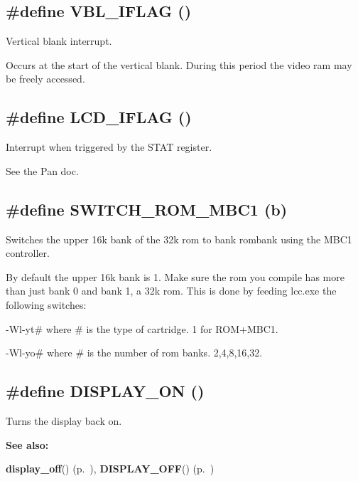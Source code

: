 \subsection{\setlength{\rightskip}{0pt plus 5cm}\#define VBL\_\-IFLAG ()}

Vertical blank interrupt.

Occurs at the start of the vertical blank. During this period the video ram may be freely accessed. \label{gb.h_a18}
\subsection{\setlength{\rightskip}{0pt plus 5cm}\#define LCD\_\-IFLAG ()}

Interrupt when triggered by the STAT register.

See the Pan doc. \label{gb.h_a35}
\subsection{\setlength{\rightskip}{0pt plus 5cm}\#define SWITCH\_\-ROM\_\-MBC1 (b)}

Switches the upper 16k bank of the 32k rom to bank rombank using the MBC1 controller.

By default the upper 16k bank is 1. Make sure the rom you compile has more than just bank 0 and bank 1, a 32k rom. This is done by feeding lcc.exe the following switches:

-Wl-yt\# where \# is the type of cartridge. 1 for ROM+MBC1.

-Wl-yo\# where \# is the number of rom banks. 2,4,8,16,32. \label{gb.h_a43}
\subsection{\setlength{\rightskip}{0pt plus 5cm}\#define DISPLAY\_\-ON ()}

Turns the display back on.

\begin{Desc}
\item[{\bf See also: }]\par
{\bf display\_\-off}() {\rm (p.~\pageref{gb.h_a76})}, {\bf DISPLAY\_\-OFF}() {\rm (p.~\pageref{gb.h_a44})} \end{Desc}
\label{gb.h_a44}
